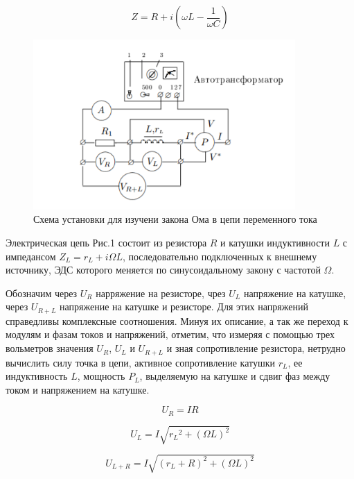 \documentclass[a4paper, 14pt]{extarticle}%
\begin{document}
\begin{equation}\label{}
Z = R + i(\omega L - \frac{1}{\omega C})
\end{equation}

\begin{figure}[h]
	\includegraphics[width= 10cm]{pics/Pic1.png}
	\caption{Схема установки для изучени закона Ома в цепи переменного тока}
	\label{Pic1}
\end{figure}

Электрическая цепь Рис.1 состоит из резистора $R$ и катушки индуктивности $L$ с импедансом $Z_L = r_L + i{\Omega}L$, последовательно подключенных к внешнему источнику, ЭДС которого меняется по синусоидальному закону с частотой $\Omega$.

Обозначим через $U_R$ нарряжение на резисторе, чрез $U_L$ напряжение на катушке, через $U_{R+L}$ напряжение на катушке и резисторе. Для этих напряжений справедливы комплексные соотношения.
\newline
Минуя их описание, а так же переход к модулям и фазам токов и напряжений, отметим, что измеряя с помощью трех вольметров значения $U_R$, $U_L$ и $U_{R+L}$ и зная сопротивление резистора, нетрудно вычислить силу точка в цепи, активное сопротивление катушки $r_L$, ее индуктивность $L$, мощность $P_L$, выделяемую на катушке и сдвиг фаз между током и напряжением на катушке.

\begin{equation}\label{}
U_R = {I}{R}
\end{equation}

\begin{equation}\label{r_l sq}
U_L = {I}{\sqrt{{r_L}^2 + ({\Omega}{L})^2}} 
\end{equation}

\begin{equation}\label{}
U_{L+R} = {I}{\sqrt{ (r_L + R)^2 + ({\Omega}{L})^2}} 
\end{equation}
\end{document}
